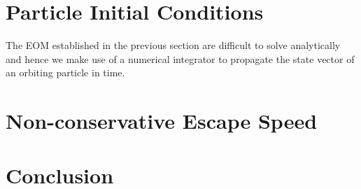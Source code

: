 \section{Particle Initial Conditions}
\label{sec:init_conditions}
The \gls{EOM} established in the previous section are difficult to solve analytically and hence we make use of a numerical integrator to propagate the state vector of an orbiting particle in time.


\section{Non-conservative Escape Speed}
\label{sec:escape_speed_derivation}


\section{Conclusion}
\label{sec:dynamics_conclusion}
